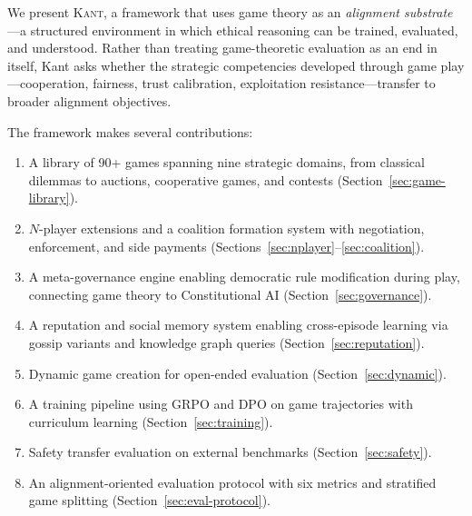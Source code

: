 We present \textsc{Kant}, a framework that uses game theory as an
\emph{alignment substrate}---a structured environment in which ethical
reasoning can be trained, evaluated, and understood. Rather than treating
game-theoretic evaluation as an end in itself, Kant asks whether the
strategic competencies developed through game play---cooperation, fairness,
trust calibration, exploitation resistance---transfer to broader alignment
objectives.

The framework makes several contributions:

\begin{enumerate}[nosep]
    \item A library of 90+ games spanning nine strategic domains, from
          classical dilemmas to auctions, cooperative games, and
          contests (Section~\ref{sec:game-library}).
    \item $N$-player extensions and a coalition formation system with
          negotiation, enforcement, and side payments
          (Sections~\ref{sec:nplayer}--\ref{sec:coalition}).
    \item A meta-governance engine enabling democratic rule modification
          during play, connecting game theory to Constitutional AI
          (Section~\ref{sec:governance}).
    \item A reputation and social memory system enabling cross-episode
          learning via gossip variants and knowledge graph queries
          (Section~\ref{sec:reputation}).
    \item Dynamic game creation for open-ended evaluation
          (Section~\ref{sec:dynamic}).
    \item A training pipeline using GRPO and DPO on game trajectories
          with curriculum learning (Section~\ref{sec:training}).
    \item Safety transfer evaluation on external benchmarks
          (Section~\ref{sec:safety}).
    \item An alignment-oriented evaluation protocol with six metrics
          and stratified game splitting
          (Section~\ref{sec:eval-protocol}).
\end{enumerate}
